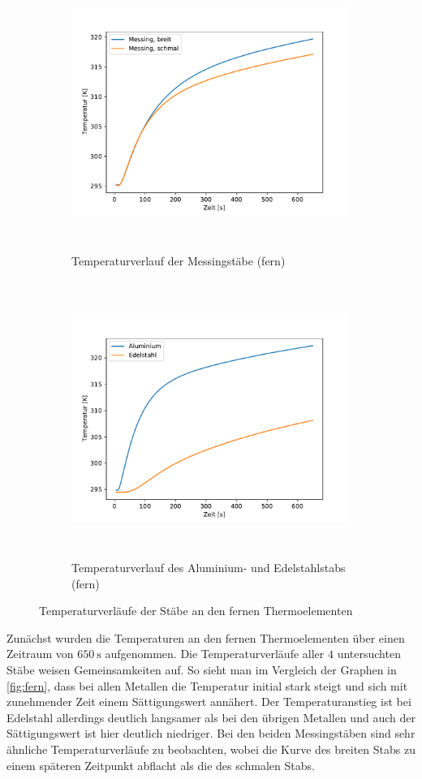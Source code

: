 \begin{figure}[H]
  \begin{subfigure}{\textwidth}
  \centering
  \includegraphics[height=9cm]{content/verlauf_mess.pdf}
  \caption{Temperaturverlauf der Messingstäbe (fern)}
  \label{fig:mess}
  \end{subfigure}
  \hfill
  \begin{subfigure}{\textwidth}
  \centering
  \includegraphics[height=9cm]{content/verlauf_alu_edel.pdf}
  \caption{Temperaturverlauf des Aluminium- und Edelstahlstabs (fern)}
  \label{fig:alu_edel}
  \end{subfigure}
  \caption{Temperaturverläufe der Stäbe an den fernen Thermoelementen}
  \label{fig:fern}
\end{figure}
Zunächst wurden die Temperaturen an den fernen Thermoelementen über einen Zeitraum von $\qty{650}{\second}$ aufgenommen.
Die Temperaturverläufe aller $4$ untersuchten Stäbe weisen Gemeinsamkeiten auf. So sieht man im Vergleich der Graphen in \autoref{fig:fern},
dass bei allen Metallen die Temperatur initial stark steigt und sich mit zunehmender Zeit einem Sättigungswert annähert.
Der Temperaturanstieg ist bei Edelstahl allerdings deutlich langsamer als bei den übrigen Metallen und auch der Sättigungswert ist hier deutlich niedriger.
Bei den beiden Messingstäben sind sehr ähnliche Temperaturverläufe zu beobachten, wobei die Kurve des breiten Stabs zu einem späteren Zeitpunkt abflacht als die des schmalen Stabs.


